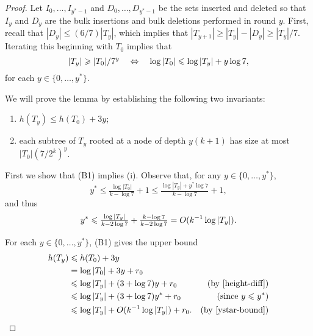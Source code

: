 \documentclass[kpfonts]{patmorin}
\let\le\leqslant
\let\ge\geqslant
\begin{document}
\begin{proof}
  Let $I_0,\ldots,I_{y^*-1}$ and $D_0,\ldots,D_{y^*-1}$ be the sets inserted and deleted so that $I_y$ and $D_y$ are the bulk insertions and bulk deletions performed in round $y$.  First, recall that $|D_y|\le (6/7)|T_y|$, which implies that $|T_{y+1}|\ge |T_y|-|D_y|\ge |T_y|/7$.  Iterating this beginning with $T_0$ implies that 
  \begin{equation}
    |T_y|\ge |T_0|/7^y \quad \Leftrightarrow \quad \log|T_0| \le \log|T_y| + y\log 7, \eqlabel{height-diff}
  \end{equation}
  for each $y\in\{0,\ldots,y^*\}$. 


  We will prove the lemma by establishing the following two invariants:
  \begin{enumerate}[(B1)]
    \item $h(T_y)\le h(T_0) + 3y$;
    \item each subtree of $T_y$ rooted at a node of depth $y(k+1)$ has size at most $|T_0|(7/2^k)^{y}$.
  \end{enumerate}

  First we show that (B1) implies (i). Observe that, for any $y\in\{0,\ldots,y^*\}$,  
  \[  
  y^*\le \tfrac{\log |T_0|}{k-\log 7}+1\le \tfrac{\log |T_y|+y^*\log 7}{k-\log 7}+1, 
  \]
  and thus 
  \begin{equation}  
    y^*\le \tfrac{\log |T_y|}{k-2\log 7}+ \tfrac{k-\log 7}{k-2\log 7} = O(k^{-1}\log|T_y|). 
    \eqlabel{ystar-bound}
  \end{equation}


  For each  $y\in\{0,\ldots,y^*\}$, (B1) gives the upper bound
  \begin{align*}
       h(T_y) & \le h(T_0) + 3y \\
              &= \log|T_0| + 3y + r_0  \\
              &\le \log |T_y| + (3+\log 7)y + r_0  &\text{(by \eqref{height-diff})} \\
              &\le \log |T_y| + (3+\log 7)y^* + r_0 &\text{(since $y\le y^*$)}\\
              &\le \log |T_y| + O(k^{-1}\log|T_y|) + r_0. &\text{(by \eqref{ystar-bound})}
  \end{align*}


\end{proof}
\end{document}
